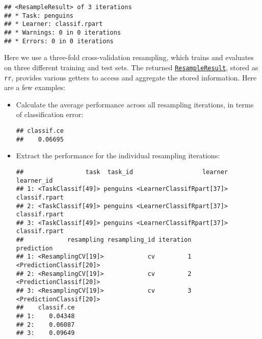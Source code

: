 \documentclass[
]{scrbook}
\newenvironment{Shaded}{\begin{snugshade}}{\end{snugshade}}
\newcommand{\FunctionTok}[1]{\textcolor[rgb]{0.00,0.00,0.00}{#1}}
\newcommand{\NormalTok}[1]{#1}
\newcommand{\SpecialCharTok}[1]{\textcolor[rgb]{0.00,0.00,0.00}{#1}}
\newcommand{\StringTok}[1]{\textcolor[rgb]{0.31,0.60,0.02}{#1}}
\renewenvironment{Shaded} {\begin{snugshade}\small} {\end{snugshade}}
\begin{document}
\begin{verbatim}
## <ResampleResult> of 3 iterations
## * Task: penguins
## * Learner: classif.rpart
## * Warnings: 0 in 0 iterations
## * Errors: 0 in 0 iterations
\end{verbatim}

Here we use a three-fold cross-validation resampling, which trains and evaluates on three different training and test sets.
The returned \href{https://mlr3.mlr-org.com/reference/ResampleResult.html}{\texttt{ResampleResult}}, stored as \texttt{rr}, provides various getters to access and aggregate the stored information.
Here are a few examples:

\begin{itemize}
\item
  Calculate the average performance across all resampling iterations, in terms of classification error:

\begin{Shaded}
\end{Shaded}

\begin{verbatim}
## classif.ce 
##    0.06695
\end{verbatim}
\item
  Extract the performance for the individual resampling iterations:

\begin{Shaded}
\end{Shaded}

\begin{verbatim}
##                 task  task_id                   learner    learner_id
## 1: <TaskClassif[49]> penguins <LearnerClassifRpart[37]> classif.rpart
## 2: <TaskClassif[49]> penguins <LearnerClassifRpart[37]> classif.rpart
## 3: <TaskClassif[49]> penguins <LearnerClassifRpart[37]> classif.rpart
##            resampling resampling_id iteration              prediction
## 1: <ResamplingCV[19]>            cv         1 <PredictionClassif[20]>
## 2: <ResamplingCV[19]>            cv         2 <PredictionClassif[20]>
## 3: <ResamplingCV[19]>            cv         3 <PredictionClassif[20]>
##    classif.ce
## 1:    0.04348
## 2:    0.06087
## 3:    0.09649
\end{verbatim}


\end{itemize}
\end{document}
